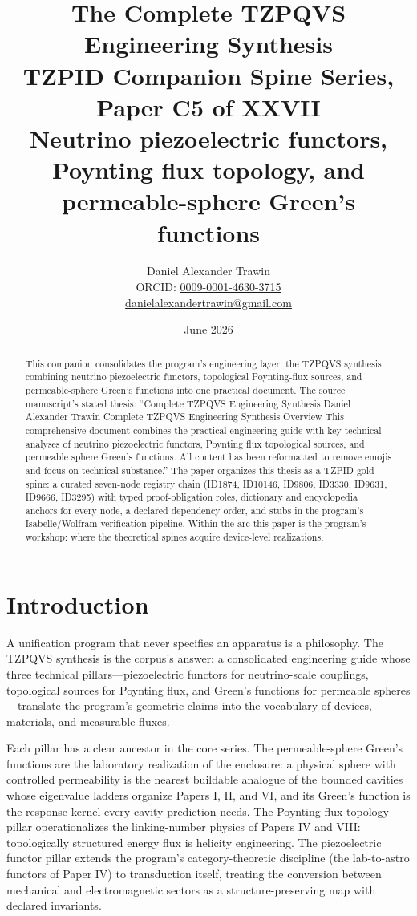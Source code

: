 \documentclass[11pt]{article}
\title{The Complete TZPQVS Engineering Synthesis\\[0.6em]
\large TZPID Companion Spine Series, Paper C5 of XXVII\\
\normalsize Neutrino piezoelectric functors, Poynting flux topology, and permeable-sphere Green's functions}
\author{Daniel Alexander Trawin\\
\small ORCID: \href{https://orcid.org/0009-0001-4630-3715}{0009-0001-4630-3715}\\
\small \href{mailto:danielalexandertrawin@gmail.com}{danielalexandertrawin@gmail.com}}
\date{June 2026}
\theoremstyle{remark}
\begin{document}
\maketitle

\begin{abstract}
This companion consolidates the program's engineering layer: the TZPQVS synthesis combining neutrino piezoelectric functors, topological Poynting-flux sources, and permeable-sphere Green's functions into one practical document.
The source manuscript's stated thesis: ``Complete TZPQVS Engineering Synthesis Daniel Alexander Trawin Complete TZPQVS Engineering Synthesis Overview This comprehensive document combines the practical engineering guide with key technical analyses of neutrino piezoelectric functors, Poynting flux topological sources, and permeable sphere Green's functions. All content has been reformatted to remove emojis and focus on technical substance.'' The paper organizes this thesis as a TZPID gold spine: a curated seven-node registry chain (ID1874, ID10146, ID9806, ID3330, ID9631, ID9666, ID3295) with typed proof-obligation roles, dictionary and encyclopedia anchors for every node, a declared dependency order, and stubs in the program's Isabelle/Wolfram verification pipeline. Within the arc this paper is the program's workshop: where the theoretical spines acquire device-level realizations.
\end{abstract}

\section{Introduction}
\label{sec:intro}

A unification program that never specifies an apparatus is a philosophy. The TZPQVS synthesis is the corpus's answer: a consolidated engineering guide whose three technical pillars---piezoelectric functors for neutrino-scale couplings, topological sources for Poynting flux, and Green's functions for permeable spheres---translate the program's geometric claims into the vocabulary of devices, materials, and measurable fluxes.

Each pillar has a clear ancestor in the core series. The permeable-sphere Green's functions are the laboratory realization of the enclosure: a physical sphere with controlled permeability is the nearest buildable analogue of the bounded cavities whose eigenvalue ladders organize Papers I, II, and VI, and its Green's function is the response kernel every cavity prediction needs. The Poynting-flux topology pillar operationalizes the linking-number physics of Papers IV and VIII: topologically structured energy flux is helicity engineering. The piezoelectric functor pillar extends the program's category-theoretic discipline (the lab-to-astro functors of Paper IV) to transduction itself, treating the conversion between mechanical and electromagnetic sectors as a structure-preserving map with declared invariants.
\end{document}
